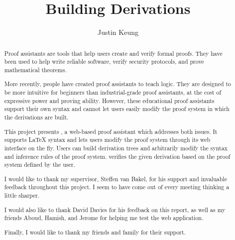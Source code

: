\documentclass[a4paper, twoside, 11pt]{report}
\title{Building Derivations}
\author{Justin Keung}
\begin{document}


\begin{abstract}
Proof assistants are tools that help users create and verify formal proofs. They have been used to help write reliable software, verify security protocols, and prove mathematical theorems.

More recently, people have created proof assistants to teach logic. They are designed to be more intuitive for beginners than industrial-grade proof assistants, at the cost of expressive power and proving ability. However, these educational proof assistants  support their own syntax and cannot let users easily modify the proof system in which the derivations are built.

This project presents \projectname{}, a web-based proof assistant which addresses both issues. It supports \LaTeX{} syntax and lets users modify the proof system through its web interface on the fly. Users can build derivation trees and arbitrarily modify the syntax and inference rules of the proof system. \projectname{} verifies the given derivation based on the proof system defined by the user.

\end{abstract}

\renewcommand{\abstractname}{Acknowledgements}
\begin{abstract}
I would like to thank my supervisor, Steffen van Bakel, for his support and invaluable feedback throughout this project. I seem to have come out of every meeting thinking a little sharper.

I would also like to thank David Davies for his feedback on this report, as well as my friends Aboud, Hamish, and Jerome for helping me test the web application.

Finally, I would like to thank my friends and family for their support.
\end{abstract}

\pagestyle{toc}
\tableofcontents
\listoffigures

\pagestyle{fancy}
\clearpage
{}






% 

\DeclareRobustCommand{\VAN}[3]{#3}
\printbibliography[heading=bibintoc, title={Bibliography}]

\pagebreak

\end{document}
